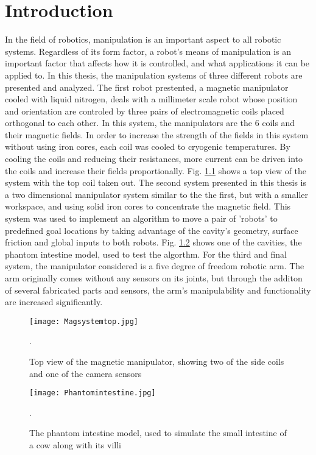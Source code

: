 
\chapter[Introduction]{Introduction}
\label{chap-intro}

In the field of robotics, manipulation is an important aspect to all robotic systems. Regardless of its form factor, a robot's means of manipulation is an important factor that affects how it is controlled, and what applications it can be applied to. In this thesis, the manipulation systems of three different robots are presented and analyzed. The first robot prestented, a magnetic manipulator cooled with liquid nitrogen, deals with a millimeter scale robot whose position and orientation are controled by three pairs of electromagnetic coils placed orthogonal to each other. In this system, the manipulators are the 6 coils and their magnetic fields. In order to increase the strength of the fields in this system without using iron cores, each coil was cooled to cryogenic temperatures.  By cooling the coils and reducing their resistances, more current can be driven into the coils and increase their fields proportionally.  Fig. \ref{MagTopPic} shows a top view of the system with the top coil taken out.  The second system presented in this thesis is a two dimensional manipulator system similar to the the first, but with a smaller workspace, and using solid iron cores to concentrate the magnetic field. This system was used to implement an algorithm to move a pair of 'robots' to predefined goal locations by taking advantage of the cavity's geometry, surface friction and global inputs to both robots. Fig. \ref{Intestine} shows one of the cavities, the phantom intestine model, used to test the algorthm.  For the third and final system, the manipulator considered is a five degree of freedom robotic arm. The arm originally comes without any sensors on its joints, but through the additon of several fabricated parts and sensors, the arm's manipulability and functionality are increased significantly. 


\begin{figure}
\centering
	\texttt{[image: Magsystemtop.jpg]}
	\caption{Top view of the magnetic manipulator, showing  two of the side coils and one of the camera sensors}.
	\label{MagTopPic}
\end{figure}  
\begin{figure}
\centering
	\texttt{[image: Phantomintestine.jpg]}
	\caption{The phantom intestine model, used to simulate the small intestine of a cow along with its villi}.
	\label{Intestine}
\end{figure} 